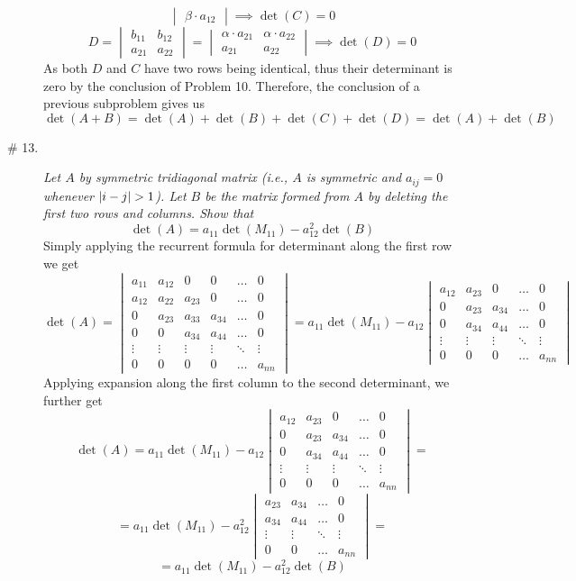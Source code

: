 \documentclass[8pt]{article} %
\begin{document}
\begin{description}
{\begin{enumerate}[(a)]
{\[\begin{vmatrix}
				\beta\cdot a_{12}\end{vmatrix}\implies\det(C)=0\]
				\[D=\begin{vmatrix}b_{11}&b_{12}\\a_{21}&a_{22}\end{vmatrix}=\begin{vmatrix}\alpha\cdot a_{21}&
					\alpha\cdot a_{22}\\a_{21}&a_{22}\end{vmatrix}\implies\det(D)=0\]
			As both $D$ and $C$ have two rows being identical, thus their determinant is zero by the conclusion of Problem
			10. Therefore, the conclusion of a previous subproblem gives us
			\[\det(A+B)=\det(A)+\det(B)+\det(C)+\det(D)=\det(A)+\det(B)\]
			}
	\end{enumerate}
	}
\item[\# 13.]{{\it Let $A$ by symmetric tridiagonal matrix (i.e., $A$ is symmetric and $a_{ij}=0$ whenever $\myabs{i-j}>1$). Let $B$ be the matrix
	formed from $A$ by deleting the first two rows and columns. Show that \[\det(A)=a_{11}\det(M_{11})-a_{12}^2\det(B)\]}
	Simply applying the recurrent formula for determinant along the first row we get	
	\[\det(A)=\begin{vmatrix}
		a_{11}&a_{12}&0&0&\dots&0\\
		a_{12}&a_{22}&a_{23}&0&\dots&0\\
		0&a_{23}&a_{33}&a_{34}&\dots&0\\
		0&0&a_{34}&a_{44}&\dots&0\\
		\vdots&\vdots&\vdots&\vdots&\ddots&\vdots\\
		0&0&0&0&\dots&a_{nn}
	\end{vmatrix}=
		a_{11}\det(M_{11})-a_{12}\begin{vmatrix}
		a_{12}&a_{23}&0&\dots&0\\
		0&a_{23}&a_{34}&\dots&0\\
		0&a_{34}&a_{44}&\dots&0\\
		\vdots&\vdots&\vdots&\ddots&\vdots\\
		0&0&0&\dots&a_{nn}
			\end{vmatrix}\]
			Applying expansion along the first column to the second determinant, we further get
			\[\det(A)=
		a_{11}\det(M_{11})-a_{12}\begin{vmatrix}
		a_{12}&a_{23}&0&\dots&0\\
		0&a_{23}&a_{34}&\dots&0\\
		0&a_{34}&a_{44}&\dots&0\\
		\vdots&\vdots&\vdots&\ddots&\vdots\\
		0&0&0&\dots&a_{nn}
			\end{vmatrix}=\]\[=
			a_{11}\det(M_{11})-a_{12}^2\begin{vmatrix}
				a_{23}&a_{34}&\dots&0\\
				a_{34}&a_{44}&\dots&0\\
				\vdots&\vdots&\ddots&\vdots\\
				0&0&\dots&a_{nn}
			\end{vmatrix}=\]\[=a_{11}\det(M_{11})-a_{12}^2\det(B)\]
	}

\end{description}
\end{document}
